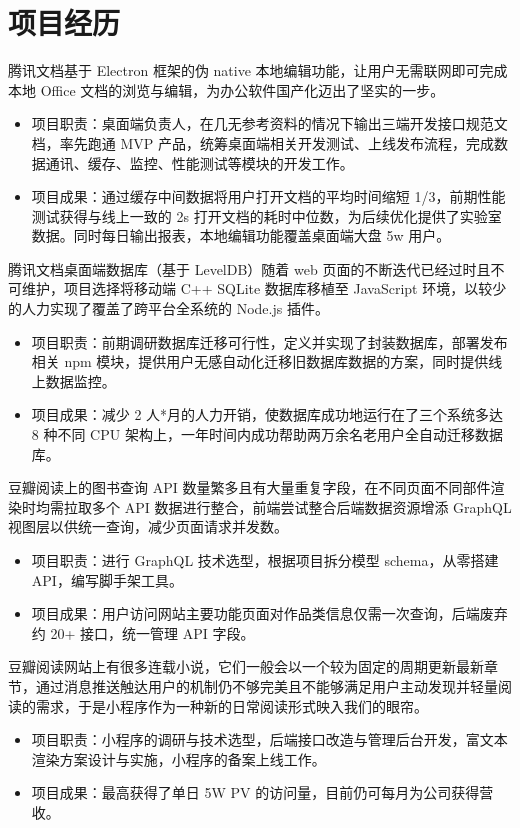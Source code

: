 \documentclass[11pt,a4paper,roman]{moderncv}   %
\begin{document}
\section{项目经历}
{腾讯文档基于 Electron 框架的伪 native 本地编辑功能，让用户无需联网即可完成本地 Office 文档的浏览与编辑，为办公软件国产化迈出了坚实的一步。
\begin{itemize}
  \item 项目职责：桌面端负责人，在几无参考资料的情况下输出三端开发接口规范文档，率先跑通 MVP 产品，统筹桌面端相关开发测试、上线发布流程，完成数据通讯、缓存、监控、性能测试等模块的开发工作。
  \item 项目成果：通过缓存中间数据将用户打开文档的平均时间缩短 1/3，前期性能测试获得与线上一致的 2s 打开文档的耗时中位数，为后续优化提供了实验室数据。同时每日输出报表，本地编辑功能覆盖桌面端大盘 5w 用户。
\end{itemize}
}


{
腾讯文档桌面端数据库（基于 LevelDB）随着 web 页面的不断迭代已经过时且不可维护，项目选择将移动端 C++ SQLite 数据库移植至 JavaScript 环境，以较少的人力实现了覆盖了跨平台全系统的 Node.js 插件。
\begin{itemize}
  \item 项目职责：前期调研数据库迁移可行性，定义并实现了封装数据库，部署发布相关 npm 模块，提供用户无感自动化迁移旧数据库数据的方案，同时提供线上数据监控。
  \item 项目成果：减少 2 人*月的人力开销，使数据库成功地运行在了三个系统多达 8 种不同 CPU 架构上，一年时间内成功帮助两万余名老用户全自动迁移数据库。
\end{itemize}
}

{豆瓣阅读上的图书查询 API 数量繁多且有大量重复字段，在不同页面不同部件渲染时均需拉取多个 API 数据进行整合，前端尝试整合后端数据资源增添 GraphQL 视图层以供统一查询，减少页面请求并发数。
\begin{itemize}
  \item 项目职责：进行 GraphQL 技术选型，根据项目拆分模型 schema，从零搭建 API，编写脚手架工具。
  \item 项目成果：用户访问网站主要功能页面对作品类信息仅需一次查询，后端废弃约 20+ 接口，统一管理 API 字段。
\end{itemize}
}


{豆瓣阅读网站上有很多连载小说，它们一般会以一个较为固定的周期更新最新章节，通过消息推送触达用户的机制仍不够完美且不能够满足用户主动发现并轻量阅读的需求，于是小程序作为一种新的日常阅读形式映入我们的眼帘。
\begin{itemize}
  \item 项目职责：小程序的调研与技术选型，后端接口改造与管理后台开发，富文本渲染方案设计与实施，小程序的备案上线工作。
  \item 项目成果：最高获得了单日 5W PV 的访问量，目前仍可每月为公司获得营收。
\end{itemize}
}
\end{document}

